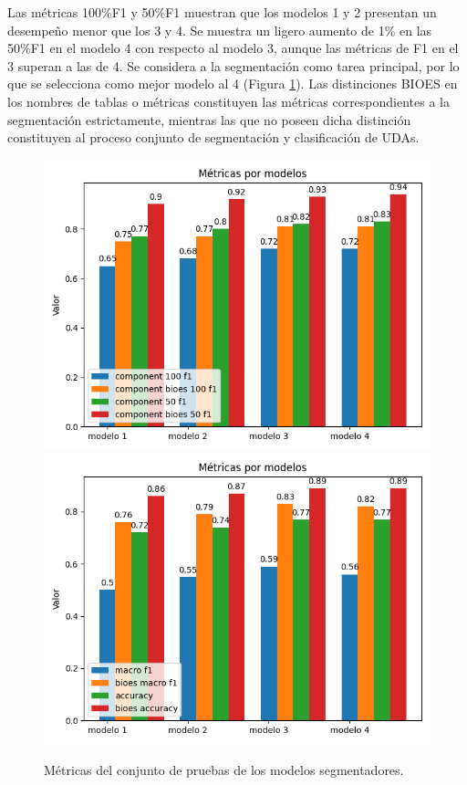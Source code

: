 Las métricas 100\%F1 y 50\%F1 muestran que los modelos 1 y 2 presentan un desempeño menor que los 3 y 4. 
Se muestra un ligero aumento de 1\% en las 50\%F1 en el modelo 4 con respecto 
al modelo 3, aunque las métricas de F1 en el 3 superan a las de 4. Se considera a la 
segmentación como tarea principal, por lo que se selecciona como mejor modelo al 4 (Figura \ref{fig:test_segmenter_model_metrics}).
Las distinciones BIOES en los nombres de tablas o métricas constituyen las métricas correspondientes 
a la segmentación estrictamente, mientras las que no poseen dicha distinción constituyen al proceso 
conjunto de segmentación y clasificación de UDAs. 

\begin{figure}[h!]
	\begin{center}
		\includegraphics[scale=.4]{Graphics/persuasive_essays_all_linked_components.png}
		\includegraphics[scale=.4]{Graphics/persuasive_essays_all_linked_macro_micro_metrics.png}
	    \caption{Métricas del conjunto de pruebas de los modelos segmentadores.}\label{fig:test_segmenter_model_metrics}
	\end{center}
\end{figure}

